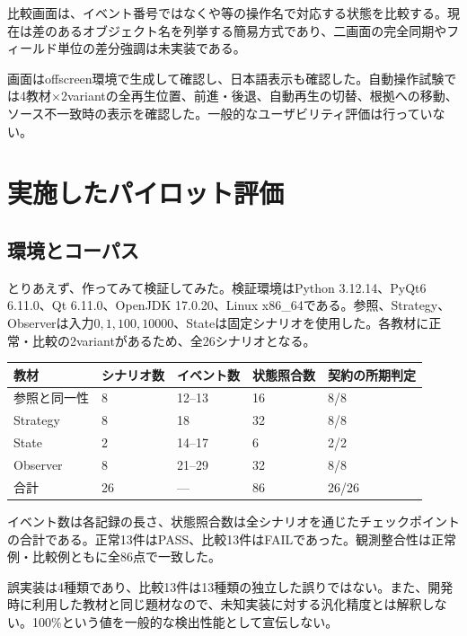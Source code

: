 \documentclass[a4paper,11pt]{ltjsarticle}
\newcommand{\code}[1]{\texttt{\detokenize{#1}}}
\begin{document}
比較画面は、イベント番号ではなく\code{switch}や\code{notified}等の操作名で対応する状態を比較する。現在は差のあるオブジェクト名を列挙する簡易方式であり、二画面の完全同期やフィールド単位の差分強調は未実装である。

画面はoffscreen環境で生成して確認し、日本語表示も確認した。自動操作試験では4教材×2variantの全再生位置、前進・後退、自動再生の切替、根拠への移動、ソース不一致時の表示を確認した。一般的なユーザビリティ評価は行っていない。
\clearpage

\section{実施したパイロット評価}
\subsection{環境とコーパス}
とりあえず、作ってみて検証してみた。検証環境はPython 3.12.14、PyQt6 6.11.0、Qt 6.11.0、OpenJDK 17.0.20、Linux x86\_64である。参照、Strategy、Observerは入力$0,1,100,10000$、Stateは固定シナリオを使用した。各教材に正常・比較の2variantがあるため、全26シナリオとなる。

\begin{longtable}{P{34mm}P{24mm}P{25mm}P{26mm}P{31mm}}
\toprule
教材 & シナリオ数 & イベント数 & 状態照合数 & 契約の所期判定\\\midrule
\endhead
参照と同一性 & 8 & 12--13 & 16 & 8/8\\
Strategy & 8 & 18 & 32 & 8/8\\
State & 2 & 14--17 & 6 & 2/2\\
Observer & 8 & 21--29 & 32 & 8/8\\\midrule
合計 & 26 & --- & 86 & 26/26\\
\bottomrule
\end{longtable}
イベント数は各記録の長さ、状態照合数は全シナリオを通じたチェックポイントの合計である。正常13件はPASS、比較13件はFAILであった。観測整合性は正常例・比較例ともに全86点で一致した。

誤実装は4種類であり、比較13件は13種類の独立した誤りではない。また、開発時に利用した教材と同じ題材なので、未知実装に対する汎化精度とは解釈しない。100\%という値を一般的な検出性能として宣伝しない。
\end{document}
